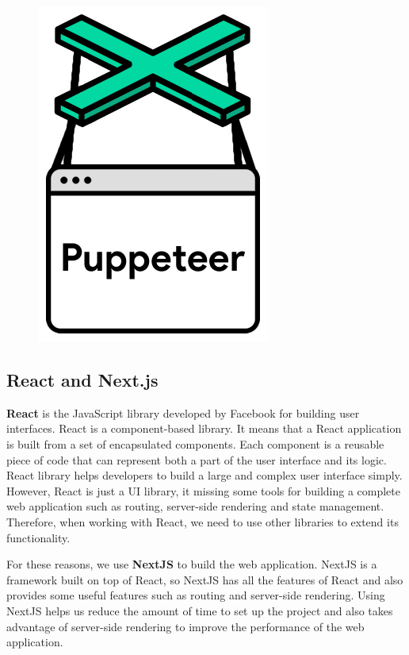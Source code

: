 \begin{figure}[ht]
    \centering 
    \includegraphics[height=0.2\textheight]{Images/8.Technology_Stack/puppeteer.png}
\end{figure}

\subsection{React and Next.js}
\textbf{React} is the JavaScript library developed by Facebook for building user interfaces. React is a component-based library. It means that a React application is built from a set of encapsulated components. Each component is a reusable piece of code that can represent both a part of the user interface and its logic. React library helps developers to build a large and complex user interface simply. However, React is just a UI library, it missing some tools for building a complete web application such as routing, server-side rendering and state management. Therefore, when working with React, we need to use other libraries to extend its functionality. 

For these reasons, we use \textbf{NextJS} to build the web application. NextJS is a framework built on top of React, so NextJS has all the features of React and also provides some useful features such as routing and server-side rendering. Using NextJS helps us reduce the amount of time to set up the project and also takes advantage of server-side rendering to improve the performance of the web application.


